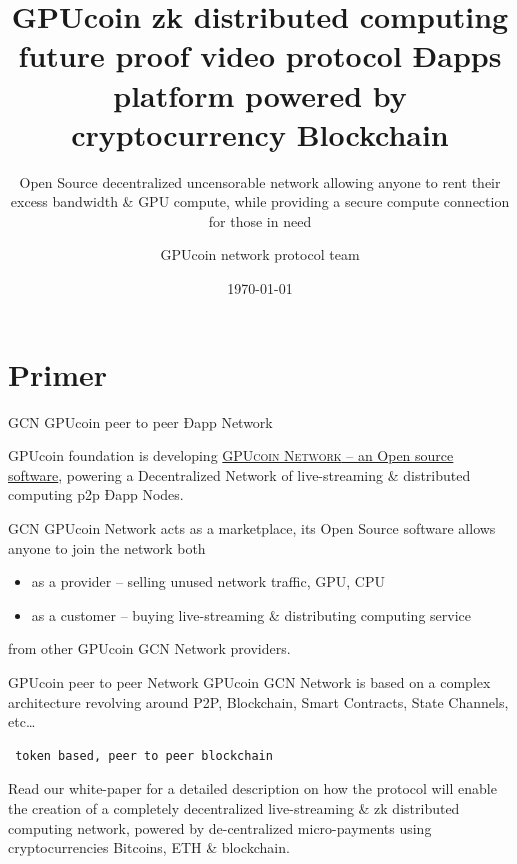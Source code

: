 \documentclass[10pt,handout]{beamer}
\title{GPUcoin zk distributed computing future proof video protocol Ðapps platform powered by cryptocurrency Blockchain}
\subtitle{Open Source decentralized uncensorable network allowing anyone to rent their excess bandwidth \& GPU compute, while providing a secure compute connection for those in need}
\date{\today}
\author{GPUcoin network protocol team}
\institute{ GPUcoin Foundation}
\newcommand{\themename}{\textbf{\textsc{metropolis}}\xspace}
\begin{document}
\maketitle


\section{Primer}

{%

\begin{frame}[fragile]{GCN GPUcoin peer to peer Ðapp Network }

 GPUcoin foundation is developing \href{https://onhoot.com/tokensale}{\textsc{GPUcoin Network} – an Open source software}, powering a Decentralized Network of live-streaming \& distributed computing p2p Ðapp Nodes.
 

GCN GPUcoin Network acts as a marketplace, its Open Source software allows anyone to join the network both 

\begin{itemize}
\item as a provider – selling unused network traffic, GPU, CPU
\item as a customer – buying live-streaming \& distributing computing service
\end{itemize}
 from other GPUcoin GCN Network providers. 
\end{frame}
}%
\begin{frame}[fragile]{GPUcoin peer to peer Network }
GPUcoin GCN Network is based on a complex architecture revolving around P2P, Blockchain, Smart Contracts, State Channels, etc\ldots
 \begin{verbatim} 
 token based, peer to peer blockchain 
 \end{verbatim}
 
 Read our white-paper for a detailed description on how the protocol will enable the creation of a completely decentralized live-streaming \& zk distributed computing network, powered by de-centralized micro-payments using cryptocurrencies Bitcoins, ETH \& blockchain. 


\end{frame}
\end{document}
